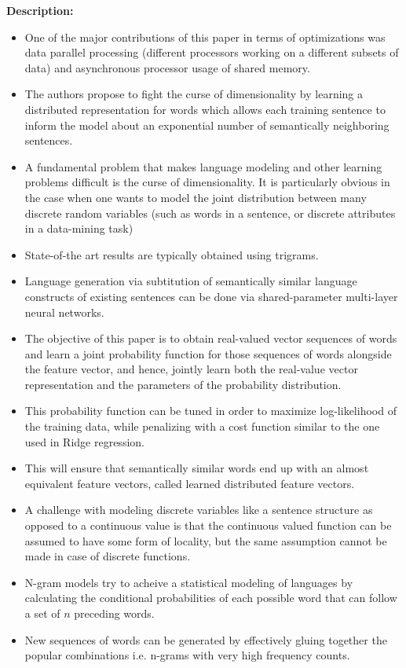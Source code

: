 \documentclass[11pt,a4paper]{article}
\begin{document}
  \textbf{Description:}
  \begin{itemize}
    \item
    One of the major contributions of this paper in terms of optimizations was data parallel processing (different processors working on a different subsets of data) and asynchronous processor usage of shared memory.
    \item
    The authors propose to fight the curse of dimensionality by learning a distributed representation for words which allows each training sentence to inform the model about an exponential number of semantically neighboring sentences.
    \item
    A fundamental problem that makes language modeling and other learning problems difficult is the curse of dimensionality. It is particularly obvious in the case when one wants to model the joint distribution between many discrete random variables (such as words in a sentence, or discrete attributes in a data-mining task)
    \item
    State-of-the art results are typically obtained using trigrams.
    \item
    Language generation via subtitution of semantically similar language constructs of existing sentences can be done via shared-parameter multi-layer neural networks.
    \item
    The objective of this paper is to obtain real-valued vector sequences of words and learn a joint probability function for those sequences of words alongside the feature vector, and hence, jointly learn both the real-value vector representation and the parameters of the probability distribution.
    \item
    This probability function can be tuned in order to maximize log-likelihood of the training data, while penalizing with a cost function similar to the one used in Ridge regression.
    \item
    This will ensure that semantically similar words end up with an almost equivalent feature vectors, called learned distributed feature vectors.
    \item
    A challenge with modeling discrete variables like a sentence structure as opposed to a continuous value is that the continuous valued function can be assumed to have some form of locality, but the same assumption cannot be made in case of discrete functions.
    \item
    N-gram models try to acheive a statistical modeling of languages by calculating the conditional probabilities of each possible word that can follow a set of $n$ preceding words.
    \item
    New sequences of words can be generated by effectively gluing together the popular combinations i.e. n-grams with very high frequency counts.
  \end{itemize}
\end{document}
